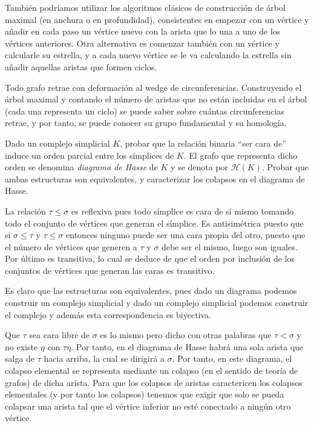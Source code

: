 \documentclass[twoside]{article}
\begin{document}
\begin{solucion}
También podríamos utilizar los algoritmos clásicos de construcción de árbol maximal (en anchura o en profundidad), consistentes en empezar con un vértice y añadir en cada paso un vértice nuevo con la arista que lo una a uno de los vértices anteriores. Otra alternativa es comenzar también con un vértice y calcularle su estrella, y a cada nuevo vértice se le va calculando la estrella sin añadir aquellas aristas que formen ciclos.

\begin{nota}
Todo grafo retrae con deformación al wedge de circunferencias. Construyendo el árbol maximal y contando el número de aristas que no están incluidas en el árbol (cada una representa un ciclo) se puede saber sobre cuántas circunferencias retrae, y por tanto, se puede conocer su grupo fundamental y su homología.
\end{nota}
\end{solucion}

\newpage

\begin{ejercicio}{1.8}
Dado un complejo simplicial $K$, probar que la relación binaria ``ser cara de'' induce un orden parcial entre los símplices de $K$.
El grafo que representa dicho orden se denomina \emph{diagrama de Hasse} de $K$ y se denota por $\mathcal{H}(K)$.
Probar que ambas estructuras son equivalentes, y caracterizar los colapsos en el diagrama de Hasse.
\end{ejercicio}
\begin{solucion}
La relación $\tau\leq\sigma$ es reflexiva pues todo símplice es cara de sí mismo tomando todo el conjunto de vértices que generan el símplice. Es antisimétrica puesto que si $\sigma\leq\tau$ y $\tau\leq\sigma$ entonces ninguno puede ser una cara propia del otro, puesto que el número de vértices que generen a $\tau$ y $\sigma$ debe ser el mismo, luego son iguales. Por último es transitiva, lo cual se deduce de que el orden por inclusión de los conjuntos de vértices que generan las caras es transitivo.

Es claro que las estructuras son equivalentes, pues dado un diagrama podemos construir un complejo simplicial y dado un complejo simplicial podemos construir el complejo y además esta correspondencia es biyectiva.


Que $\tau$ sea cara libre de $\sigma$ es lo mismo pero dicho con otras palabras que $\tau<\sigma$ y no existe $\eta$ con $\tau\eta$. Por tanto, en el diagrama de Hasse habrá una sola arista que salga de $\tau$ hacia arriba, la cual se dirigirá a $\sigma$. Por tanto, en este diagrama, el colapso elemental se representa mediante un colapso (en el sentido de teoría de grafos) de dicha arista. Para que los colapsos de aristas caractericen los colapsos elementales (y por tanto los colapsos) tenemos que exigir que solo se pueda colapsar una arista tal que el vértice inferior no esté conectado a ningún otro vértice. 
\end{solucion}
\end{document}

